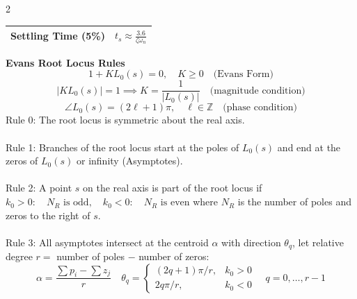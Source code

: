 \documentclass[10pt, fleqn]{article}
\begin{document}
\begin{multicols*}{2}
\begin{center}
\begin{tabular}{@{}ll@{}}
Settling Time (5\%)
& $\displaystyle t_s\approx\frac{3.6}{\zeta\omega_n}$ \\
\bottomrule
\end{tabular}
\end{center}
\textbf{Evans Root Locus Rules}\\
\[1 + KL_0(s) = 0,\quad K \geq 0\quad \text{(Evans Form)}\]
\[\boxed{|K L_0(s)| = 1\implies K = \frac{1}{|L_0(s)|} \quad \text{(magnitude condition)}}\]
\[ \boxed{\angle{L_0(s)} = (2\ell+1)\pi,\quad \ell \in \mathbb{Z}\quad \text{(phase condition)}}\]
Rule 0: The root locus is symmetric about the real axis. \\\\
Rule 1: Branches of the root locus start at the poles of $L_0(s)$ and end at the zeros of $L_0(s)$ or infinity (Asymptotes). \\\\
Rule 2: A point $s$ on the real axis is part of the root locus if
$k_0 > 0 : \quad N_R \text{ is odd},\quad 
k_0 < 0 : \quad N_R \text{ is even}$
where $N_R$ is the number of poles and zeros to the right of $s$. \\\\
Rule 3: All asymptotes intersect at the centroid $\alpha$ with direction $\theta_q$, let relative degree $r = $  number of poles $-$ number of zeros:
{\scriptsize
\[
\boxed{\alpha=\frac{\sum p_i-\sum z_j}{r}}
\quad
\boxed{\theta_q=
\begin{cases}
(2q+1)\pi/r,&k_0>0\\
2q\pi/r,&k_0<0
\end{cases}
\quad q=0,\ldots,r-1}
\]
}










\end{multicols*}
\end{document}
